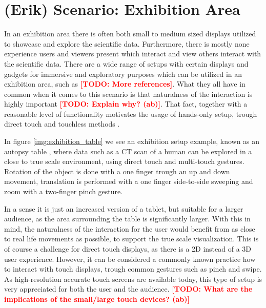 \documentclass[review,journal]{vgtc}         %
\newcommand{\todo}[1]{\textbf{\textcolor{red}{[TODO: {#1}]}}}
\begin{document}
\section{(Erik) Scenario: Exhibition Area}

In an exhibition area there is often both small to medium sized displays utilized to showcase and explore the scientific data. Furthermore, there is mostly none experience users and viewers present which interact and view others interact with the scientific data. There are a wide range of setups with certain displays and gadgets for immersive and exploratory purposes which can be utilized in an exhibition area, such as \cite{Laha:2013:VCB:2491367.2491368} \todo{More references}. What they all have in common when it comes to this scenario is that naturalness of the interaction is highly important \todo{Explain why? (ab)}. That fact, together with a reasonable level of functionality motivates the usage of hands-only setup, trough direct touch \cite{Klein:2012:DSD:2322389.2322403} and touchless methods \cite{O'hara:2013:NTP:2442106.2442111}.

In figure \ref{img:exhibition_table} we see an exhibition setup example, known as an autopsy table \cite{LRFPY11}, where data such as a CT scan of a human can be explored in a close to true scale environment, using direct touch and multi-touch gestures. Rotation of the object is done with a one finger trough an up and down movement, translation is performed with a one finger side-to-side sweeping and zoom with a two-finger pinch gesture.

In a sense it is just an increased version of a tablet, but suitable for a larger audience, as the area surrounding the table is significantly larger. With this in mind, the naturalness of the interaction for the user would benefit from as close to real life movements as possible, to support the true scale visualization. This is of course a challenge for direct touch displays, as there is a 2D instead of a 3D user experience. However, it can be considered a commonly known practice how to interact with touch displays, trough common gestures such as pinch and swipe. As high-resolution accurate touch screens are available today, this type of setup is very appreciated for both the user and the audience.
\todo{What are the implications of the small/large touch devices? (ab)}
\end{document}
